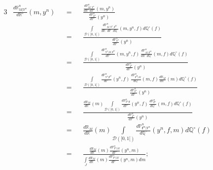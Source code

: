 \begin{alignat*}{3}
&\frac{d\mathds{R}_{M \vert Y^{n}}^{n}}{d\mathds{R}^{\circ}}(m, y^{n}) &&=&& \frac{\frac{d\mathds{P}_{M, Y^{n}}^{n}}{d\mathds{R}^{\circ} \, d\mathds{P}^{\circ}}(m, y^{n})}{\frac{d\mathds{P}_{Y^{n}}^{n}}{d \mathds{P}^{\circ}}(y^{n})}\\
& &&=&&\frac{\int\limits_{\mathcal{D}([0,1[)}\frac{d\mathds{P}_{M, Y^{n}, \boldsymbol{f}^{M}}^{n}}{d\mathds{R}^{\circ} \, d\mathds{P}^{\circ} \, d\mathds{Q}^{\circ}}(m, y^{n}, f)d\mathds{Q}^{\circ}(f)}{\frac{d\mathds{P}_{Y^{n}}^{n}}{d \mathds{P}^{\circ}}(y^{n})}\\
& &&=&&\frac{\int\limits_{\mathcal{D}([0,1[)}\frac{d\mathds{P}_{Y^{n} \vert M, \boldsymbol{f}^{M}}^{n}}{d\mathds{P}^{\circ}}(m, y^{n}, f) \, \frac{d\mathds{P}_{M, \boldsymbol{f}^{M}}^{n}}{d\mathds{R}^{\circ} \, d\mathds{Q}^{\circ}}(m, f)d\mathds{Q}^{\circ}(f)}{\frac{d\mathds{P}_{Y^{n}}^{n}}{d \mathds{P}^{\circ}}(y^{n})}\\
& &&=&&\frac{\int\limits_{\mathcal{D}([0,1[)}\frac{d\mathds{P}_{Y^{n} \vert \boldsymbol{f}^{M}}^{n}}{d\mathds{P}^{\circ}}(y^{n}, f) \, \frac{d\mathds{P}_{\boldsymbol{f}^{M}\vert M}^{n}}{d\mathds{Q}^{\circ}}(m, f) \frac{d \mathds{R}_{M}}{d\mathds{R}^{\circ}}(m)d\mathds{Q}^{\circ}(f)}{\frac{d\mathds{P}_{Y^{n}}^{n}}{d \mathds{P}^{\circ}}(y^{n})}\\
& &&=&&\frac{\frac{d \mathds{R}_{M}}{d\mathds{R}^{\circ}}(m) \int\limits_{\mathcal{D}([0,1[)}\frac{d\mathds{P}_{Y^{n} \vert \boldsymbol{f}}^{n}}{d\mathds{P}^{\circ}}(y^{n}, f) \, \frac{d\mathds{P}_{\boldsymbol{f}^{m}}^{n}}{d\mathds{Q}^{\circ}}(m, f) d\mathds{Q}^{\circ}(f)}{\frac{d\mathds{P}_{Y^{n}}^{n}}{d \mathds{P}^{\circ}}(y^{n})}\\
& &&=&&\frac{d \mathds{R}_{M}}{d\mathds{R}^{\circ}}(m) \int\limits_{\mathcal{D}([0,1[)}\frac{d\mathds{P}_{\boldsymbol{f}^{m}\vert Y^{n}}^{n}}{d\mathds{Q}^{\circ}}(y^{n}, f, m) d\mathds{Q}^{\circ}(f)\\
& &&=&&\frac{\frac{d \mathds{R}_{M}}{d\mathds{R}^{\circ}}(m) \frac{d\mathds{P}_{Y^{n} \vert M}^{n}}{d\mathds{P}^{\circ}}(y^{n}, m)}{\int\limits_{J}\frac{d \mathds{R}_{M}}{d\mathds{R}^{\circ}}(m) \frac{d\mathds{P}_{Y^{n} \vert M}^{n}}{d\mathds{P}^{\circ}}(y^{n}, m) dm};
\end{alignat*}

